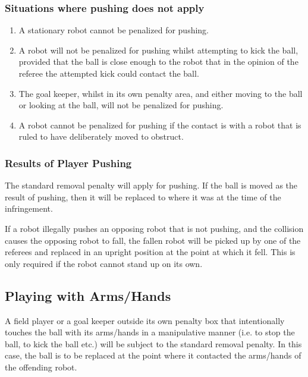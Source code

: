 \documentclass[12pt]{article}
\begin{document}
\subsubsection{Situations where pushing does not apply}
\label{sec:not_pushing}

\begin{enumerate}

\item A stationary robot cannot be penalized for pushing.

\item A robot will not be penalized for pushing whilst attempting to kick the ball, provided that the ball is close enough to the robot that in the opinion of the referee the attempted kick could contact the ball.

\item The goal keeper, whilst in its own penalty area, and either moving to the ball or looking at the ball, will not be penalized for pushing.

\item A robot cannot be penalized for pushing if the contact is with a robot that is ruled to have deliberately moved to obstruct.

\end{enumerate}

\subsubsection{Results of Player Pushing}

The standard removal penalty will apply for pushing. If the ball is moved as the result of pushing, then it will be replaced to where it was at the time of the infringement.

If a robot illegally pushes an opposing robot that is not pushing, and the collision causes the opposing robot to fall, the fallen robot will be picked up by one of the referees and replaced in an upright position at the point at which it fell. This is only required if the robot cannot stand up on its own.

\subsection{Playing with Arms/Hands}
\label{sec:hand_ball}

A field player or a goal keeper outside its own penalty box that intentionally touches the ball with its arms/hands in a manipulative manner (i.e. to stop the ball, to kick the ball etc.) will be subject to the standard removal penalty. In this case, the ball is to be replaced at the point where it contacted the arms/hands of the offending robot.
\end{document}
